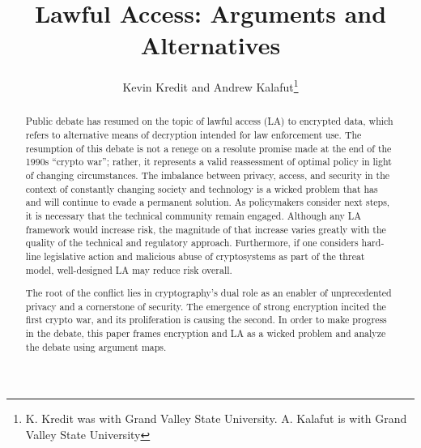 \documentclass{IEEEtran}
\begin{document}

\title{Lawful Access: Arguments and Alternatives}

\author{Kevin Kredit and Andrew Kalafut\thanks{K. Kredit was with Grand Valley State University. A. Kalafut is with Grand Valley State University}}


\maketitle



\begin{abstract}


Public debate has resumed on the topic of lawful access (LA) to encrypted data, which refers to alternative means of
decryption intended for law enforcement use. The resumption of this debate is not a renege on a resolute promise made at
the end of the 1990s ``crypto war''; rather, it represents a valid reassessment of optimal policy in light of changing
circumstances. The imbalance between privacy, access, and security in the context of constantly changing society and
technology is a wicked problem that has and will continue to evade a permanent solution. As policymakers consider next
steps, it is necessary that the technical community remain engaged. Although any LA framework would increase risk, the
magnitude of that increase varies greatly with the quality of the technical and regulatory approach. Furthermore, if one
considers hard-line legislative action and malicious abuse of cryptosystems as part of the threat model, well-designed
LA may reduce risk overall.

The root of the conflict lies in cryptography's dual role as an enabler of unprecedented privacy and a
cornerstone of security. The emergence of strong encryption incited the first crypto war, and its proliferation is
causing the second. In order to make progress in the debate, this paper frames encryption and LA as a wicked problem and
analyze the debate using argument maps.

\end{abstract}
\end{document}
